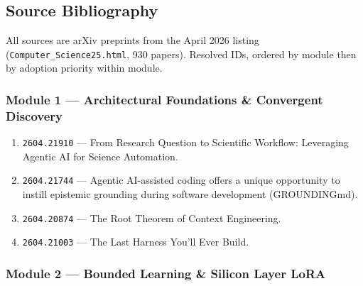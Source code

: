 \documentclass[11pt,letterpaper]{article}
\newcommand{\arxivid}[1]{\texttt{\textcolor{accent}{#1}}}
\begin{document}
\subsection{Source Bibliography}

All sources are arXiv preprints from the April 2026 listing (\texttt{Computer\_Science25.html}, 930 papers). Resolved IDs, ordered by module then by adoption priority within module.

\subsubsection{Module 1 --- Architectural Foundations \& Convergent Discovery}

\begin{enumerate}[leftmargin=*]
\item \arxivid{2604.21910} --- From Research Question to Scientific Workflow: Leveraging Agentic AI for Science Automation.
\item \arxivid{2604.21744} --- Agentic AI-assisted coding offers a unique opportunity to instill epistemic grounding during software development (GROUNDINGmd).
\item \arxivid{2604.20874} --- The Root Theorem of Context Engineering.
\item \arxivid{2604.21003} --- The Last Harness You'll Ever Build.
\end{enumerate}

\subsubsection{Module 2 --- Bounded Learning \& Silicon Layer LoRA}
\end{document}
